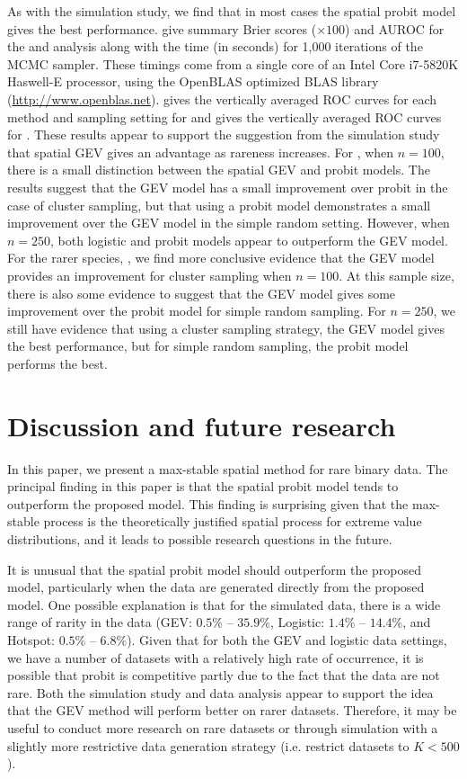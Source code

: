 \documentclass[11pt]{article}
\begin{document}
As with the simulation study, we find that in most cases the spatial probit model gives the best performance.
 give summary Brier scores ($\times 100$) and AUROC for the \tamarix{} and \hedysarum{} analysis along with the time (in seconds) for 1,000 iterations of the MCMC sampler.
These timings come from a single core of an Intel Core i7-5820K Haswell-E processor, using the OpenBLAS optimized BLAS library (\url{http://www.openblas.net}).
 gives the vertically averaged ROC curves for each method and sampling setting for \tamarix{} and  gives the vertically averaged ROC curves for \hedysarum{}.
These results appear to support the suggestion from the simulation study that spatial GEV gives an advantage as rareness increases.
For \tamarix, when $n = 100$, there is a small distinction between the spatial GEV and probit models.
The results suggest that the GEV model has a small improvement over probit in the case of cluster sampling, but that using a probit model demonstrates a small improvement over the GEV model in the simple random setting.
However, when $n = 250$, both logistic and probit models appear to outperform the GEV model.
For the rarer species, \hedysarum, we find more conclusive evidence that the GEV model provides an improvement for cluster sampling when $n = 100$.
At this sample size, there is also some evidence to suggest that the GEV model gives some improvement over the probit model for simple random sampling.
For $n = 250$, we still have evidence that using a cluster sampling strategy, the GEV model gives the best performance, but for simple random sampling, the probit model performs the best.

\section{Discussion and future research}\label{rbs:conclusions}

In this paper, we present a max-stable spatial method for rare binary data.
The principal finding in this paper is that the spatial probit model tends to outperform the proposed model.
This finding is surprising given that the max-stable process is the theoretically justified spatial process for extreme value distributions, and it leads to possible research questions in the future.

It is unusual that the spatial probit model should outperform the proposed model, particularly when the data are generated directly from the proposed model.
One possible explanation is that for the simulated data, there is a wide range of rarity in the data (GEV: $0.5\%$ -- $35.9\%$, Logistic: $1.4\%$ -- $14.4\%$, and Hotspot: $0.5\%$ -- $6.8\%$).
Given that for both the GEV and logistic data settings, we have a number of datasets with a relatively high rate of occurrence, it is possible that probit is competitive partly due to the fact that the data are not rare.
Both the simulation study and data analysis appear to support the idea that the GEV method will perform better on rarer datasets.
Therefore, it may be useful to conduct more research on rare datasets or through simulation with a slightly more restrictive data generation strategy (i.e. restrict datasets to $K < 500$).
\end{document}
